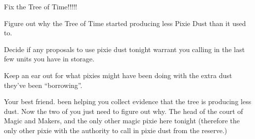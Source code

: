 \documentclass[char]{PP}
\begin{document}
\begin{itemz}
	\item Fix the Tree of Time!!!!!
	\item Figure out why the Tree of Time started producing less Pixie Dust than it used to.
	\item Decide if any proposals to use pixie dust tonight warrant you calling in the last few units you have in storage.
	\item Keep an ear out for what pixies might have been doing with the extra dust they’ve been “borrowing”.
\end{itemz}

\begin{itemz}[Notes]
	\item 
\end{itemz}

\begin{contacts}
	\contact{\cSHelp{}} Your best friend. \cSHelp{\They} \cSHelp{\have} been helping you collect evidence that the tree is producing less dust. Now the two of you just need to figure out why.
	\contact{\cMHead{}} The head of the court of Magic and Makers, and the only other magic pixie here tonight (therefore the only other pixie with the authority to call in pixie dust from the reserve.)
\end{contacts}
\end{document}
